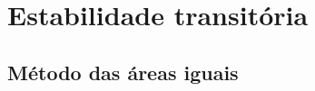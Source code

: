 \section{Estabilidade transitória}

\lipsum[1]

\subsection{Método das áreas iguais}
\lipsum[1]


\pagebreak

